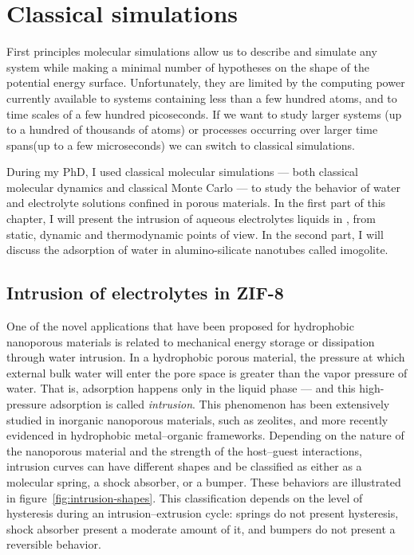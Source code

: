 \documentclass[thesis]{subfiles}
\begin{document}
\OnlyInSubfile{\setcounter{chapter}{4}}
\chapter{Classical simulations}
\label{sec:classical}

First principles molecular simulations allow us to describe and simulate any
system while making a minimal number of hypotheses on the shape of the potential
energy surface. Unfortunately, they are limited by the computing power currently
available to systems containing less than a few hundred atoms, and to time
scales of a few hundred picoseconds. If we want to study larger systems (up to a
hundred of thousands of atoms) or processes occurring over larger time spans(up
to a few microseconds) we can switch to classical simulations.

During my PhD, I used classical molecular simulations --- both classical
molecular dynamics and classical Monte Carlo --- to study the behavior of water
and electrolyte solutions confined in porous materials. In the first part of
this chapter, I will present the intrusion of aqueous electrolytes liquids
in , from static, dynamic and thermodynamic points of view. In the second
part, I will discuss the adsorption of water in alumino-silicate nanotubes
called imogolite.

\newpage
\section{Intrusion of electrolytes in ZIF-8}
\label{sec:zif8-intrusion}

One of the novel applications that have been proposed for hydrophobic nanoporous
materials is related to mechanical energy storage or dissipation through water
intrusion\cite{Eroshenko2001, Soulard2004}. In a hydrophobic porous material,
the pressure at which external bulk water will enter the pore space is greater
than the vapor pressure of water. That is, adsorption happens only in the liquid
phase --- and this high-pressure adsorption is called
\emph{intrusion}\cite{Fraux2017}. This phenomenon has been extensively studied
in inorganic nanoporous materials, such as zeolites\cite{Saada2010,
Desbiens2005, Humplik2014a, Humplik2014b}, and more recently evidenced in
hydrophobic metal--organic frameworks\cite{Ortiz2013, Grosu2015,
MichelinJamois2015}. Depending on the nature of the nanoporous material and the
strength of the host--guest interactions, intrusion curves can have different
shapes and be classified as either as a molecular spring, a shock absorber, or a
bumper. These behaviors are illustrated in figure~\ref{fig:intrusion-shapes}.
This classification depends on the level of hysteresis during an
intrusion--extrusion cycle: springs do not present hysteresis, shock absorber
present a moderate amount of it, and bumpers do not present a reversible
behavior.
\end{document}
